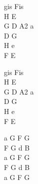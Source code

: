 \begin{chord}
    \small{
    gis Fis\\
    H E\\
    G D A2 a\\
    D G\\
    H e\\
    F E

    gis Fis\\
    H E\\
    G D A2 a\\
    D G\\
    H e\\
    F E

    a G F G\\
    F G d B\\
    a G F G\\
    F G d B\\
    a G F G
    }
\end{chord}